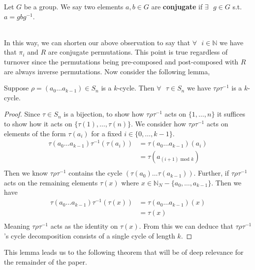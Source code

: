 \begin{definition}
  Let $G$ be a group. We say two elements $a,b\in{G}$ are
  {\bf{conjugate}} if $\exists\text{ }g\in{G}$ s.t. $a=gbg^{-1}$.
\end{definition}
\text{}\\In this way, we can shorten our above observation to say that
$\forall\text{ }i\in\mathbb{N}$ we have that $\pi_i$ and $R$ are
conjugate permutations. This point is true regardless of turnover
since the permutations being pre-composed and post-composed with $R$
are always inverse permutations. Now consider the following lemma,\\
\begin{lemma}
  Suppose $\rho=(a_0\dots a_{k-1})\in S_n$ is a $k$-cycle. Then
  $\forall\text{ }\tau\in S_n$ we have
  $\tau\rho\tau^{-1}$ is a $k$-cycle.
  \label{conjugate_cycle}
\end{lemma}
\begin{proof}
  Since $\tau\in S_n$ is a bijection, to show how $\tau\rho\tau^{-1}$
  acts on $\{1,\dots, n\}$ it suffices to show how it acts on
  $\{\tau(1), \dots, \tau(n)\}$.
  We consider how $\tau\rho\tau^{-1}$ acts on elements of the form
  $\tau(a_i)$ for a fixed $i\in\{0,\dots,k-1\}$.
  \begin{align*}
    \tau(a_0\dots a_{k-1})\tau^{-1}(\tau(a_i)) & = \tau(a_0\dots
    a_{k-1})(a_i)
    \\
    & = \tau(a_{(i+1)\text{ mod }k}) \\
  \end{align*}
  Then we know $\tau\rho\tau^{-1}$ contains the cycle
  $(\tau(a_0)\dots \tau(a_{k-1}))$.
  Further, if $\tau\rho\tau^{-1}$ acts on the remaining elements
  $\tau(x)$ where $x\in\mathbb{N}_N - \{a_0,\dots,a_{k-1}\}$.
  Then we have
  \begin{align*}
    \tau(a_0\dots a_{k-1})\tau^{-1}(\tau(x)) & = \tau(a_0\dots a_{k-1})(x) \\
    & = \tau(x)                   \\
  \end{align*}
  Meaning $\tau\rho\tau^{-1}$ acts as the identity on $\tau(x)$. From
  this we can deduce that
  $\tau\rho\tau^{-1}$'s cycle decomposition consists of a single
  cycle of length $k$.
\end{proof}

\noindent This lemma leads us to the following theorem that will be of deep
relevance for the remainder of the paper.

